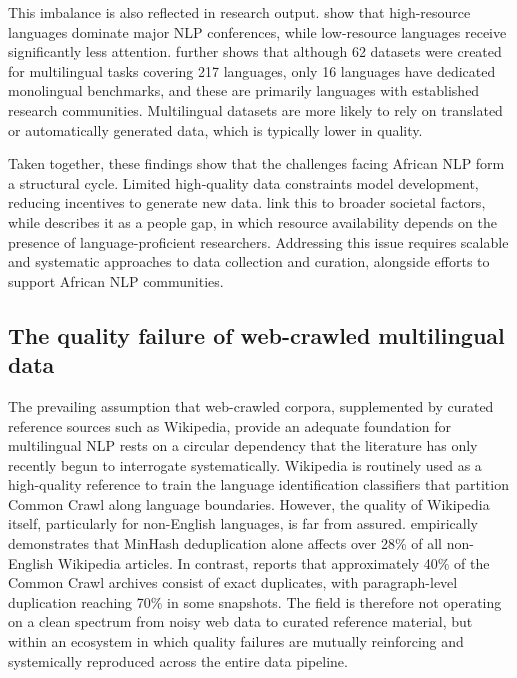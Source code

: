 \documentclass[11pt,a4paper]{article}
\begin{document}
This imbalance is also reflected in research output. \citet{joshi2020state} show that high-resource languages dominate major NLP conferences, while low-resource languages receive significantly less attention. \citet{yu2022beyond} further shows that although 62 datasets were created for multilingual tasks covering 217 languages, only 16 languages have dedicated monolingual benchmarks, and these are primarily languages with established research communities. Multilingual datasets are more likely to rely on translated or automatically generated data, which is typically lower in quality.

Taken together, these findings show that the challenges facing African NLP form a structural cycle. Limited high-quality data constraints model development, reducing incentives to generate new data. \citet{nekoto2020participatory} link this to broader societal factors, while \citet{yu2022beyond} describes it as a people gap, in which resource availability depends on the presence of language-proficient researchers. Addressing this issue requires scalable and systematic approaches to data collection and curation, alongside efforts to support African NLP communities.

\subsection{The quality failure of web-crawled multilingual data}

The prevailing assumption that web-crawled corpora, supplemented by curated reference sources such as Wikipedia, provide an adequate foundation for multilingual NLP rests on a circular dependency that the literature has only recently begun to interrogate systematically. Wikipedia is routinely used as a high-quality reference to train the language identification classifiers that partition Common Crawl along language boundaries. However, the quality of Wikipedia itself, particularly for non-English languages, is far from assured. \citet{tatariya2024good} empirically demonstrates that MinHash deduplication alone affects over 28\% of all non-English Wikipedia articles. In contrast, \citet{perelkiewicz2024review} reports that approximately 40\% of the Common Crawl archives consist of exact duplicates, with paragraph-level duplication reaching 70\% in some snapshots. The field is therefore not operating on a clean spectrum from noisy web data to curated reference material, but within an ecosystem in which quality failures are mutually reinforcing and systemically reproduced across the entire data pipeline.
\end{document}
